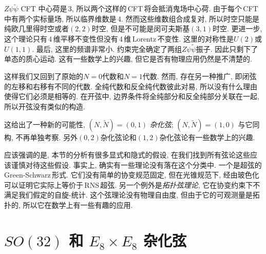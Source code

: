 $Z\psi\tilde{\psi} $ CFT 中心荷是\,3, 所以两个这样的\,CFT\,将会抵消鬼场中心荷. 由于每个\,CFT\,中有两个实标量场, 所以临界维数是\,4. 然而这些维数组合成复对, 所以时空只能是纯欧几里得时空或者$ (2,2) $时空, 但是不可能是闵可夫斯基$ (3,1) $时空. 更进一步, 这个理论只有\,4\,维平移不变性但没有\,4\,维\,Lorentz\,不变性. 这里的对称性是$ U(2) $或$ U(1,1)$. 最后, 这里的频谱非常小. 约束完全确定了两组$ Z\psi\tilde{\psi} $振子. 因此只剩下了单态的质心运动. 这有一些数学上的兴趣, 但它是否有物理应用仍然是不清楚的.

这样我们又回到了原始的$ N=0 $代数和$ N=1 $代数. 然而, 存在另一种推广, 即闭弦的左移和右移有不同的代数. 全纯代数和反全纯代数彼此对易, 所以没有什么理由使得它们必须是相等的. 在开弦中, 边界条件将全纯部分和反全纯部分关联在一起, 所以开弦没有类似的构造.

这给出了一种新的可能性, $(N,\tilde{N})=(0,1)$ {\emph{杂化弦}}; $(N,\tilde{N})=(1,0)$ 与它同构, 不再单独考察. 另外$ (0,2) $杂化弦论和$ (1,2) $杂化弦论有一些数学上的兴趣.

应该强调的是, 本节的分析有很多显式和隐式的假设, 在我们找到所有弦论这些应该谨慎对待这些假设. 事实上, 确实有一些理论没有落在这个分类中. 一个是超弦的\,Green-Schwarz\,形式. 它们没有简单的协变规范固定, 但在光锥规范下, 经由玻色化可以证明它实际上等价于\,RNS\,超弦. 另一个例外是{\emph{拓扑弦理论}}, 它在协变约束下不满足我们假定的自旋-统计. 这个弦理论没有物理自由度, 但由于它的可观测量是拓扑的, 所以它在数学上有一些有趣的应用.




\section{\texorpdfstring{$SO(32)$ 和 $E_{8}\times E_{8}$ 杂化弦}{The SO(32) and E8 X E8 heterotic strings}}

